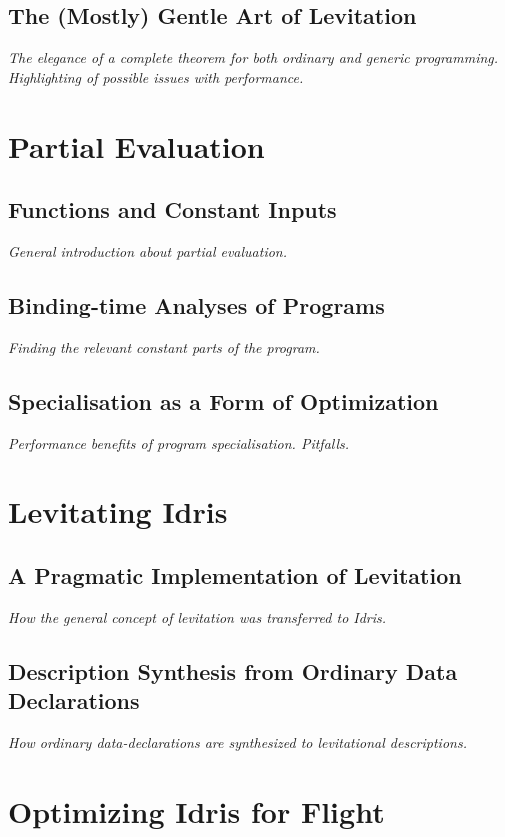 \documentclass{ituthesis}
\begin{document}
\section{The (Mostly) Gentle Art of Levitation}
\label{sec:TheMostlyGentleArtofLevitation}
\textit{The elegance of a complete theorem for both ordinary and generic programming. Highlighting of possible issues with performance.}
\chapter{Partial Evaluation}
\label{cha:PartialEvaluation}
\section{Functions and Constant Inputs}
\label{sec:FunctionsandConstantInputs}
\textit{General introduction about partial evaluation.}
\section{Binding-time Analyses of Programs}
\label{sec:Binding-timeAnalysisofPrograms}
\textit{Finding the relevant constant parts of the program.}
\section{Specialisation as a Form of Optimization}
\label{sec:SpecialisationasaFormofOptimization}
\textit{Performance benefits of program specialisation. Pitfalls.}
\chapter{Levitating Idris}
\label{cha:LevitatingIdris}
\section{A Pragmatic Implementation of Levitation}
\label{sec:APragmaticImplementationofLevitation}
\textit{How the general concept of levitation was transferred to Idris.}
\section{Description Synthesis from Ordinary Data Declarations}
\label{sec:DescriptionSynthesisFromOrdinaryDataDeclarations}
\textit{How ordinary data-declarations are synthesized to levitational descriptions.}
\chapter{Optimizing Idris for Flight}
\label{cha:OptimizingIdrisforFlight}
\end{document}

